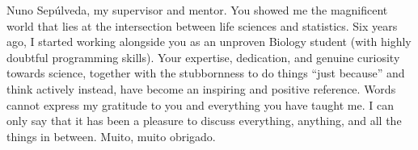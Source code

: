 Nuno Sepúlveda, my supervisor and mentor.
You showed me the magnificent world that lies at the intersection between life sciences and statistics.
Six years ago, I started working alongside you as an unproven Biology student (with highly doubtful programming skills).
Your expertise, dedication, and genuine curiosity towards science, together with the stubbornness to do things ``just because'' and think actively instead, have become an inspiring and positive reference.
Words cannot express my gratitude to you and everything you have taught me.
I can only say that it has been a pleasure to discuss everything, anything, and all the things in between.
Muito, muito obrigado.







